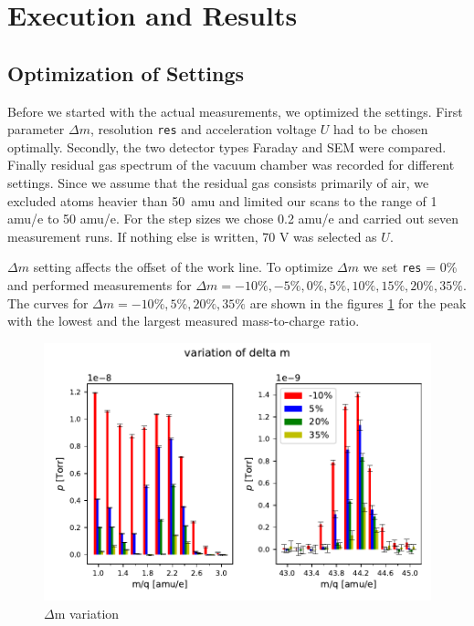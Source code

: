 \newpage
\section{Execution and Results} \label{sec:results}
    \subsection{Optimization of Settings}
    Before we started with the actual measurements, we optimized the settings.
    First parameter $\Delta m$, resolution \texttt{res} and acceleration voltage $U$ had to be chosen optimally. Secondly, the two detector types Faraday and SEM were compared. Finally residual gas spectrum of the vacuum chamber was recorded for different settings. Since we assume that the residual gas consists primarily of air, we excluded atoms heavier than 50~amu and limited our scans to the range of 1 amu/e to 50 amu/e. For the step sizes we chose 0.2 amu/e and carried out seven measurement runs. If nothing else is written, 70 V was selected as $U$.
    
    $\Delta m$ setting affects the offset of the work line. To optimize $\Delta m$ we set \texttt{res} = 0\% and performed measurements for $\Delta m = -10\%, -5\%, 0\%, 5\%, 10\%, 15\%, 20\%, 35\%$.  The curves for $\Delta m = -10\%, 5\%, 20\%, 35\%$ are shown in the figures \ref{fig:delta_m_variation} for the peak with the lowest and the largest measured mass-to-charge ratio.
    
    \begin{figure}[h!]
        \centering
        \includegraphics[width=1 \textwidth]{Report/DataResultsPlots/delta m_variation_h2_and_co2.pdf}
        \caption{$\Delta$m variation}
        \label{fig:delta_m_variation}
    \end{figure}
    
